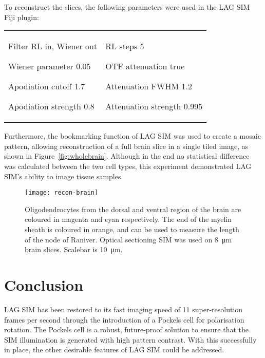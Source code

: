 To reconstruct the slices, the following parameters were used in the LAG SIM Fiji plugin:\newline
\begin{tabular}{p{}p{}}
\begin{labelling}[margin={Attenuation strength}]
	\item[Filter] RL in, Wiener out
	\item[Wiener parameter] 0.05
	\item[Apodiation cutoff] 1.7
	\item[Apodiation strength] 0.8
\end{labelling} &
\begin{labelling}[margin={Attenuation strength}]
	\item[RL steps] 5
	\item[OTF attenuation] true
	\item[Attenuation FWHM] 1.2
	\item[Attenuation strength] 0.995 
\end{labelling} %
\end{tabular}

Furthermore, the bookmarking function of LAG SIM was used to create a mosaic pattern, allowing reconstruction of a full brain slice in a single tiled image, as shown in Figure~\ref{fig:wholebrain}. 
Although in the end no statistical difference was calculated between the two cell types, this experiment demonstrated LAG SIM's ability to image tissue samples. 

\begin{figure}[tbp!]
\centering
\texttt{[image: recon-brain]}
\caption[LAG SIM: Multi-colour optical sectioning SIM to measure the node of Raniver]{Oligodendrocytes from the dorsal and ventral region of the brain are coloured in magenta and cyan respectively. The end of the myelin sheath is coloured in orange, and can be used to measure the length of the node of Raniver. Optical sectioning SIM was used on \SI{8}{\micro\metre} brain slices. Scalebar is \SI{10}{\micro\metre}. }
\label{fig:recon-brain}
\end{figure}

\section{Conclusion}
LAG SIM has been restored to its fast imaging speed of 11 super-resolution frames per second through the introduction of a Pockels cell for polarisation rotation. 
The Pockels cell is a robust, future-proof solution to ensure that the SIM illumination is generated with high pattern contrast. 
With this successfully in place, the other desirable features of LAG SIM could be addressed. 

